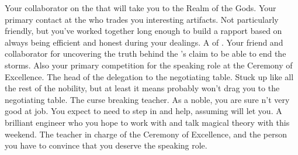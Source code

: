 \documentclass[char]{GL2020}
\begin{document}
\begin{contacts}
	\contact{\cFlowPriest{}} Your collaborator on the \iBeansNB{} that will take you to the Realm of the Gods.
	\contact{\cChupSecond{}} Your primary contact at the \pSc{} who trades you interesting artifacts. Not particularly friendly, but you've worked together long enough to build a rapport based on \cChupSecond{\them} always being efficient and honest during your dealings.
	\contact{\cHedonist{}} A \cHedonist{\cleric} of \cFarmGod{}. Your friend and collaborator for uncovering the truth behind the \pTech{}'s claim to be able to end the storms. Also your primary competition for the speaking role at the Ceremony of Excellence. 
	\contact{\cEvil{}} The head of the \pFarm{} delegation to the negotiating table. Stuck up like all the rest of the nobility, but at least it means \cEvil{\they} probably won't drag you to the negotiating table.
	\contact{\cPrince{}} The curse breaking teacher. As a noble, you are sure \cPrince{\they} \cPrince{\are}n't very good at \cPrince{\their} job. You expect to need to step in and help, assuming \cPrince{} will let you.
	\contact{\cBunker{}} A brilliant engineer who you hope to work with and talk magical theory with this weekend.
	\contact{\cMusic{}} The teacher in charge of the Ceremony of Excellence, and the person you have to convince that you deserve the speaking role.
\end{contacts}
\end{document}
